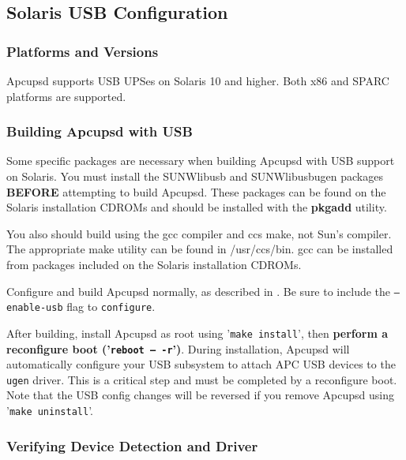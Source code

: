\subsection*{Solaris USB Configuration}

\subsubsection*{Platforms and Versions}

Apcupsd supports USB UPSes on Solaris 10 and higher. Both x86 and SPARC
platforms are supported.

\subsubsection*{Building Apcupsd with USB}

Some specific packages are necessary when building Apcupsd with USB support
on Solaris. You must install the SUNWlibusb and SUNWlibusbugen packages
{\bf BEFORE} attempting to build Apcupsd. These packages can be found on 
the Solaris installation CDROMs and should be installed with the {\bf pkgadd}
utility.

You also should build using the gcc compiler and ccs make, not Sun's
compiler. The appropriate make utility can be found in /usr/ccs/bin.
gcc can be installed from packages included on the Solaris installation
CDROMs.

Configure and build Apcupsd normally, as described in
. Be
sure to include the \texttt{{---}enable-usb} flag to \texttt{configure}.

After building, install Apcupsd as root using '\texttt{make install}', then
{\bf perform a reconfigure boot ('\texttt{reboot {---} -r}')}. During 
installation, Apcupsd will automatically configure your USB subsystem to 
attach APC USB devices to the \texttt{ugen} driver. This is a critical step
and must be completed by a reconfigure boot. Note that the USB config changes
will be reversed if you remove Apcupsd using '\texttt{make uninstall}'.

\subsubsection*{Verifying Device Detection and Driver}

